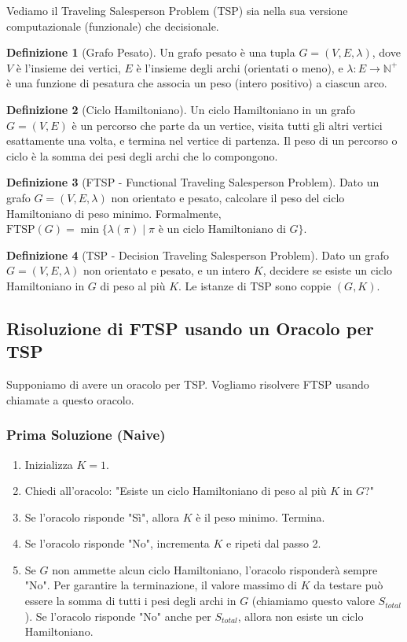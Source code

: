 \documentclass[a4paper]{article}
\theoremstyle{definition} %
\newtheorem{definition}{Definizione}
\begin{document}
Vediamo il Traveling Salesperson Problem (TSP) sia nella sua versione computazionale (funzionale) che decisionale.

\begin{definition}[Grafo Pesato]
Un grafo pesato è una tupla $G = (V, E, \lambda)$, dove $V$ è l'insieme dei vertici, $E$ è l'insieme degli archi (orientati o meno), e $\lambda: E \to \mathbb{N}^+$ è una funzione di pesatura che associa un peso (intero positivo) a ciascun arco.
\end{definition}

\begin{definition}[Ciclo Hamiltoniano]
Un ciclo Hamiltoniano in un grafo $G=(V, E)$ è un percorso che parte da un vertice, visita tutti gli altri vertici esattamente una volta, e termina nel vertice di partenza. Il peso di un percorso o ciclo è la somma dei pesi degli archi che lo compongono.
\end{definition}

\begin{definition}[FTSP - Functional Traveling Salesperson Problem]
Dato un grafo $G=(V, E, \lambda)$ non orientato e pesato, calcolare il peso del ciclo Hamiltoniano di peso minimo.
Formalmente, $\text{FTSP}(G) = \min \{ \lambda(\pi) \mid \pi \text{ è un ciclo Hamiltoniano di } G \}$.
\end{definition}

\begin{definition}[TSP - Decision Traveling Salesperson Problem]
Dato un grafo $G=(V, E, \lambda)$ non orientato e pesato, e un intero $K$, decidere se esiste un ciclo Hamiltoniano in $G$ di peso al più $K$.
Le istanze di TSP sono coppie $(G, K)$.
\end{definition}

\subsection{Risoluzione di FTSP usando un Oracolo per TSP}

Supponiamo di avere un oracolo per TSP. Vogliamo risolvere FTSP usando chiamate a questo oracolo.

\subsubsection{Prima Soluzione (Naive)}
\begin{enumerate}
    \item Inizializza $K=1$.
    \item Chiedi all'oracolo: "Esiste un ciclo Hamiltoniano di peso al più $K$ in $G$?"
    \item Se l'oracolo risponde "Sì", allora $K$ è il peso minimo. Termina.
    \item Se l'oracolo risponde "No", incrementa $K$ e ripeti dal passo 2.
    \item Se $G$ non ammette alcun ciclo Hamiltoniano, l'oracolo risponderà sempre "No". Per garantire la terminazione, il valore massimo di $K$ da testare può essere la somma di tutti i pesi degli archi in $G$ (chiamiamo questo valore $S_{total}$). Se l'oracolo risponde "No" anche per $S_{total}$, allora non esiste un ciclo Hamiltoniano.
\end{enumerate}
\end{document}

